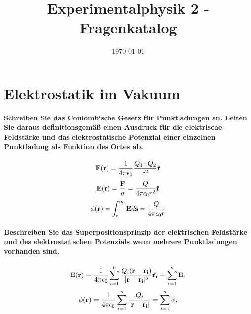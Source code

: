 \documentclass[a4paper, 11pt, parskip=half]{scrartcl}
\title{Experimentalphysik 2 - Fragenkatalog}
\date{\today}
\begin{document}
\maketitle

\newpage

\tableofcontents

\newpage

\section{Elektrostatik im Vakuum}

\paragraph{Schreiben Sie das Coulomb‘sche Gesetz für Punktladungen an. Leiten Sie daraus
definitionsgemäß einen Ausdruck für die elektrische Feldstärke und das elektrostatische Potenzial
einer einzelnen Punktladung als Funktion des Ortes ab.}

\begin{equation}
    \bold{F(r)} = \frac{1}{4 \pi \epsilon_0} \frac{Q_1 \cdot Q_2}{r^2} \bold{\hat{r}}
\end{equation}
\begin{equation}
    \bold{E(r)} = \frac{\bold{F}}{q} = \frac{Q}{4 \pi \epsilon_0 r^2} \bold{\hat{r}}
\end{equation}
\begin{equation}
    \phi(\bold{r}) = \int_{\bold{r}}^\infty \bold{E} d\bold{s} = \frac{Q}{4 \pi \epsilon_0 r}
\end{equation}

\paragraph{Beschreiben Sie das Superpositionsprinzip der elektrischen Feldstärke und des
elektrostatischen Potenzials wenn mehrere Punktladungen vorhanden sind.}

\begin{equation}
    \bold{E(r)}
    = \frac{1}{4 \pi \epsilon_0} \sum_{i=1}^n
        \frac{Q_i (\bold{r} - \bold{r_i})}{|\bold{r} - \bold{r_i}|^3} \bold{\hat{r_i}}
    = \sum_{i=1}^n \bold{E}_i
\end{equation}
\begin{equation}
    \phi(\bold{r})
    = \frac{1}{4 \pi \epsilon_0} \sum_{i=1}^n \frac{Q_i}{|\bold{r} - \bold{r_i}|}
    = \sum_{i=1}^n \phi_i
\end{equation}
\end{document}
